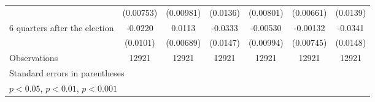 \begin{table}[htbp]
\begin{tabular}{l*{6}{c}}
                    &   (0.00753)         &   (0.00981)         &    (0.0136)         &   (0.00801)         &   (0.00661)         &    (0.0139)         \\
[1em]
 6 quarters after the election&     -0.0220\sym{*}  &      0.0113         &     -0.0333\sym{*}  &    -0.00530         &    -0.00132         &     -0.0341\sym{*}  \\
                    &    (0.0101)         &   (0.00689)         &    (0.0147)         &   (0.00994)         &   (0.00745)         &    (0.0148)         \\
\hline
Observations        &       12921         &       12921         &       12921         &       12921         &       12921         &       12921         \\
\hline\hline
\multicolumn{7}{l}{\footnotesize Standard errors in parentheses}\\
\multicolumn{7}{l}{\footnotesize \sym{*} \(p<0.05\), \sym{**} \(p<0.01\), \sym{***} \(p<0.001\)}\\
\end{tabular}
\end{table}
